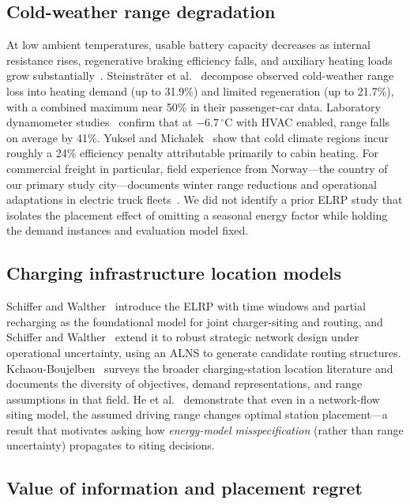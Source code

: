 \documentclass[review,3p,authoryear]{elsarticle}
\begin{document}
\subsection{Cold-weather range degradation}

At low ambient temperatures, usable battery capacity decreases as
internal resistance rises, regenerative braking efficiency falls, and
auxiliary heating loads grow substantially~\citep{Neubauer2014}.
Steinstr\"{a}ter et al.~\citep{Steinstraeter2021} decompose observed cold-weather
range loss into heating demand (up to 31.9\%) and limited regeneration
(up to 21.7\%), with a combined maximum near 50\% in their passenger-car
data.
Laboratory dynamometer studies~\citep{AAA2019} confirm that at
$-6.7\,^{\circ}$C with HVAC enabled, range falls on average by 41\%.
Yuksel and Michalek~\citep{Yuksel2015} show that cold climate regions incur roughly a 24\%
efficiency penalty attributable primarily to cabin heating.  For
commercial freight in particular, field experience from Norway---the
country of our primary study city---documents winter range reductions and
operational adaptations in electric truck fleets~\citep{Hovi2019}.
We did not identify a prior ELRP study that isolates the placement effect of
omitting a seasonal energy factor while holding the demand instances and
evaluation model fixed.

\subsection{Charging infrastructure location models}

Schiffer and Walther~\citep{Schiffer2017} introduce the ELRP with time windows and partial
recharging as the foundational model for joint charger-siting and routing,
and Schiffer and Walther~\citep{Schiffer2018} extend it to robust strategic network design under
operational uncertainty, using an ALNS to generate candidate routing
structures.  Kchaou-Boujelben~\citep{Kchaou2021} surveys the broader charging-station
location literature and documents the diversity of objectives, demand
representations, and range assumptions in that field.  He et al.~\citep{He2018} demonstrate
that even in a network-flow siting model, the assumed driving range
changes optimal station placement---a result that motivates
asking how \emph{energy-model misspecification} (rather than range
uncertainty) propagates to siting decisions.

\subsection{Value of information and placement regret}
\end{document}
